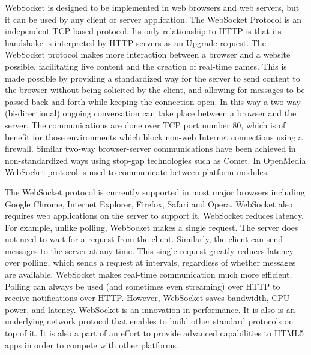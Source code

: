 WebSocket is designed to be implemented in web browsers and web servers, but it can be used by any client or server application. The WebSocket Protocol is an independent TCP-based protocol. Its only relationship to HTTP is that its handshake is interpreted by HTTP servers as an Upgrade request. The WebSocket protocol makes more interaction between a browser and a website possible, facilitating live content and the creation of real-time games. This is made possible by providing a standardized way for the server to send content to the browser without being solicited by the client, and allowing for messages to be passed back and forth while keeping the connection open. In this way a two-way (bi-directional) ongoing conversation can take place between a browser and the server. The communications are done over TCP port number 80, which is of benefit for those environments which block non-web Internet connections using a firewall. Similar two-way browser-server communications have been achieved in non-standardized ways using stop-gap technologies such as Comet. In OpenMedia WebSocket protocol is used to communicate between platform modules.

The WebSocket protocol is currently supported in most major browsers including Google Chrome, Internet Explorer, Firefox, Safari and Opera. WebSocket also requires web applications on the server to support it. WebSocket reduces latency. For example, unlike polling, WebSocket makes a single request. The server does not need to wait for a request from the client. Similarly, the client can send messages to the server at any time. This single request greatly reduces latency over polling, which sends a request at intervals, regardless of whether messages are available. WebSocket makes real-time communication much more efficient. Polling can always be used (and sometimes even streaming) over HTTP to receive notifications over HTTP. However, WebSocket saves bandwidth, CPU power, and latency. WebSocket is an innovation in performance. It is also is an underlying network protocol that enables to build other standard protocols on top of it. It is also a part of an effort to provide advanced capabilities to HTML5 apps in order to compete with other platforms.

